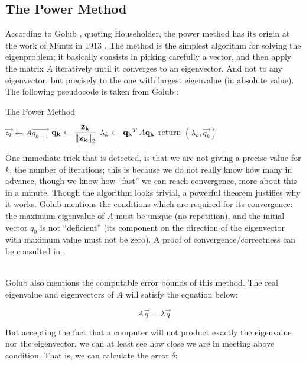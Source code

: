 \subsection{The Power Method}

According to Golub \cite{golub00}, quoting Householder, the power
method has its origin at the work of Müntz in 1913
\cite{muntz1913}. The method is the simplest algorithm for solving the
eigenproblem; it basically consists in picking carefully a vector,
and then apply the matrix $A$ iteratively until it converges to an
eigenvector. And not to any eigenvector, but precisely to the one with
largest eigenvalue (in absolute value). The following pseudocode is
taken from Golub \cite{golub13}: 

\begin{algorithm}
  \label{alg:power-method}
  \caption{The Power Method}
%
  \DontPrintSemicolon
%
%
%
    {
      $\vec{z_k} \gets A \vec{q_{k-1}}$ \;
      $\mathbf{q_k} \gets \dfrac{\mathbf{z_k}}{\left\lVert \mathbf{z_k} \right\rVert_2}$ \;
      $\lambda_k \gets \,{\mathbf{q_k}}^{T}\, A \mathbf{q_k}$ \;
    }
%
    return $(\lambda_k, \vec{q_k})$ \;
\end{algorithm}
\hfill

One immediate trick that is detected, is that we are not giving a
precise value for $k$, the number of iterations; this is because we do
not really know how many in advance, though we know how ``fast'' we
can reach convergence, more about this in a minute. Though the
algorithm looks trivial, a powerful theorem justifies why it
works. Golub mentions the  conditions which are required for its
convergence: the 
maximum eigenvalue of $A$ must be unique (no repetition), and the 
initial vector $q_0$ is not ``deficient''  (its component on the
direction of the eigenvector with maximum value must not be zero). A
proof of convergence/correctness can be consulted in \cite{golub13}. \\\

Golub also mentions the computable error bounds of this method.
The real eigenvalue and eigenvectors of $A$ will satisfy the equation
below: 

\[
A \vec{q} = \lambda \vec{q}
\]
\hfill

But accepting the fact that a computer will not product exactly the
eigenvalue nor the eigenvector, we can at least see how close we are
in meeting above condition. That is, we can calculate the error $\delta$: 

